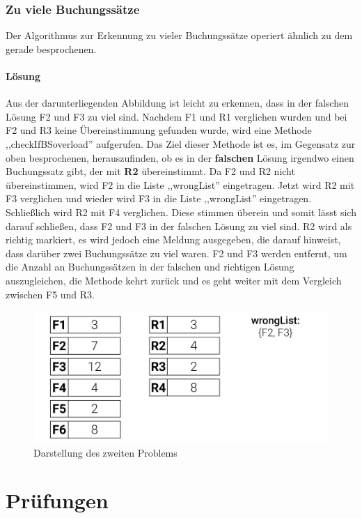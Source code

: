 \documentclass[12pt]{report}
\begin{document}
  
\subsection{Zu viele Buchungssätze}
Der Algorithmus zur Erkennung zu vieler Buchungssätze operiert ähnlich zu dem gerade besprochenen.
 
\subsubsection{Lösung}
Aus der darunterliegenden Abbildung ist leicht zu erkennen, dass in der falschen Lösung F2 und F3 zu viel sind. Nachdem F1 und R1 verglichen wurden und bei F2 und R3 keine Übereinstimmung gefunden wurde, wird eine Methode ,,checkIfBSoverload'' aufgerufen. Das Ziel dieser Methode ist es, im Gegensatz zur oben besprochenen, herauszufinden, ob es in der \textbf{falschen} Lösung irgendwo einen Buchungssatz gibt, der mit \textbf{R2} übereinstimmt. Da F2 und R2 nicht übereinstimmen, wird F2 in die Liste ,,wrongList'' eingetragen. Jetzt wird R2 mit F3 verglichen und wieder wird F3 in die Liste ,,wrongList'' eingetragen. Schließlich wird R2 mit F4 verglichen. Diese stimmen überein und somit lässt sich darauf schließen, dass F2 und F3 in der falschen Lösung zu viel sind. R2 wird als richtig markiert, es wird jedoch eine Meldung ausgegeben, die darauf hinweist, dass darüber zwei Buchungssätze zu viel waren. F2 und F3 werden entfernt, um die Anzahl an Buchungssätzen in der falschen und richtigen Lösung auszugleichen, die Methode kehrt zurück und es geht weiter mit dem Vergleich zwischen F5 und R3.
 
 
\begin{figure}[h]
	\centering
	\includegraphics[height=5cm]{images/BSoverload}
	\caption[Problem zu viele Buchungssätze]{Darstellung des zweiten Problems}
\end{figure}
  
  
  
\chapter{Prüfungen}
 
\end{document}
